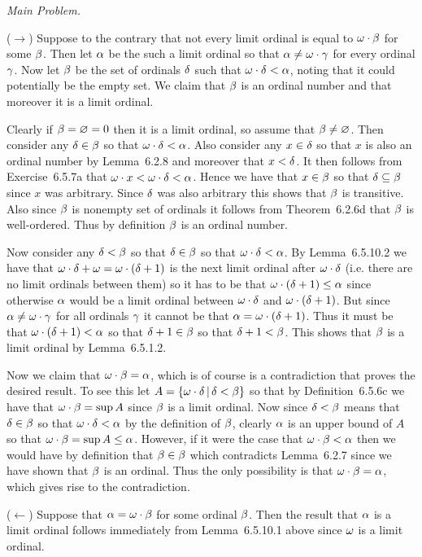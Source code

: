 \begin{solution}
    \emph{Main Problem.}

	($\to$) Suppose to the contrary that not every limit ordinal is equal to $\omega \cdot \beta$ for some $\beta$.
    Then let $\alpha$ be the such a limit ordinal so that $\alpha \neq \omega \cdot \gamma$ for every ordinal $\gamma$.
    Now let $\beta$ be the set of ordinals $\delta$ such that $\omega \cdot \delta < \alpha$, noting that it could potentially be the empty set.
    We claim that $\beta$ is an ordinal number and that moreover it is a limit ordinal.

    Clearly if $\beta = \varnothing = 0$ then it is a limit ordinal, so assume that $\beta \neq \varnothing$.
    Then consider any $\delta \in \beta$ so that $\omega \cdot \delta < \alpha$.
    Also consider any $x \in \delta$ so that $x$ is also an ordinal number by Lemma~6.2.8 and moreover that $x < \delta$.
    It then follows from Exercise~6.5.7a that $\omega \cdot x < \omega \cdot \delta < \alpha$.
    Hence we have that $x \in \beta$ so that $\delta \subseteq \beta$ since $x$ was arbitrary.
    Since $\delta$ was also arbitrary this shows that $\beta$ is transitive.
    Also since $\beta$ is nonempty set of ordinals it follows from Theorem~6.2.6d that $\beta$ is well-ordered.
    Thus by definition $\beta$ is an ordinal number.

    Now consider any $\delta < \beta$ so that $\delta \in \beta$ so that $\omega \cdot \delta < \alpha$.
    By Lemma~6.5.10.2 we have that $\omega \cdot \delta + \omega = \omega \cdot (\delta + 1)$ is the next limit ordinal after $\omega \cdot \delta$ (i.e. there are no limit ordinals between them) so it has to be that $\omega \cdot (\delta + 1) \leq \alpha$ since otherwise $\alpha$ would be a limit ordinal between $\omega \cdot \delta$ and $\omega \cdot (\delta + 1)$.
    But since $\alpha \neq \omega \cdot \gamma$ for all ordinals $\gamma$ it cannot be that $\alpha = \omega \cdot (\delta + 1)$.
    Thus it must be that $\omega \cdot (\delta + 1) < \alpha$ so that $\delta + 1 \in \beta$ so that $\delta + 1 < \beta$.
    This shows that $\beta$ is a limit ordinal by Lemma~6.5.1.2.

    Now we claim that $\omega \cdot \beta = \alpha$, which is of course is a contradiction that proves the desired result.
    To see this let $A = \left\{ \omega \cdot \delta \,|\, \delta < \beta \right\}$ so that by Definition~6.5.6c we have that $\omega \cdot \beta = \sup{A}$ since $\beta$ is a limit ordinal.
    Now since $\delta < \beta$ means that $\delta \in \beta$ so that $\omega \cdot \delta < \alpha$ by the definition of $\beta$, clearly $\alpha$ is an upper bound of $A$ so that $\omega \cdot \beta = \sup{A} \leq \alpha$.
    However, if it were the case that $\omega \cdot \beta < \alpha$ then we would have by definition that $\beta \in \beta$ which contradicts Lemma~6.2.7 since we have shown that $\beta$ is an ordinal.
    Thus the only possibility is that $\omega \cdot \beta = \alpha$, which gives rise to the contradiction.

    ($\leftarrow$) Suppose that $\alpha = \omega \cdot \beta$ for some ordinal $\beta$.
    Then the result that $\alpha$ is a limit ordinal follows immediately from Lemma~6.5.10.1 above since $\omega$ is a limit ordinal. \qedsymbol
\end{solution}

